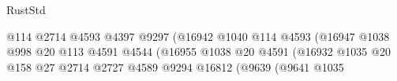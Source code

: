 \begin{lexlean}{RustStd}
\begin{coremodule}
                                                                    @114
                                                                    @2714
                                                                    @4593
                                                                    @4397
                                                                    @9297
                                                                    (@16942
                                                                      @1040
                                                                      @114
                                                                      @4593
                                                                      (@16947
                                                                        @1038
                                                                        @998
                                                                        @20
                                                                        @113
                                                                        @4591
                                                                        @4544
                                                                        (@16955
                                                                          @1038
                                                                          @20
                                                                          @4591
                                                                          (@16932
                                                                            @1035
                                                                            @20
                                                                            @158
                                                                            @27
                                                                            @2714
                                                                            @2727
                                                                            @4589
                                                                            @9294
                                                                            @16812
                                                                            (@9639
                                                                              (@9641
                                                                                @1035

\end{coremodule}
\end{lexlean}
